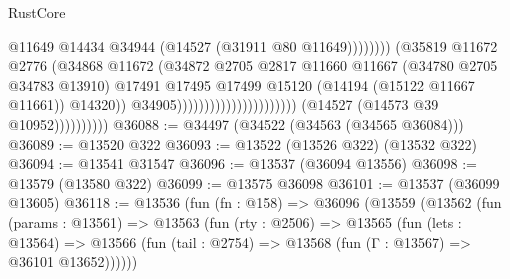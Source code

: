 \begin{lexlean}{RustCore}
\begin{coremodule}
                                                                          @11649
                                                                          @14434
                                                                          @34944
                                                                          (@14527
                                                                            (@31911
                                                                              @80
                                                                              @11649))))))))
                                                              (@35819
                                                                @11672
                                                                @2776
                                                                (@34868
                                                                  @11672
                                                                  (@34872
                                                                    @2705
                                                                    @2817
                                                                    @11660
                                                                    @11667
                                                                    (@34780 @2705 @34783 @13910)
                                                                    @17491
                                                                    @17495
                                                                    @17499
                                                                    @15120
                                                                    (@14194 (@15122 @11667 @11661))
                                                                    @14320))
                                                                @34905))))))))))))))))))))))
                    (@14527 (@14573 @39 @10952))))))))))
@36088 := @34497 (@34522 (@34563 (@34565 @36084)))
@36089 := @13520 @322
@36093 := @13522 (@13526 @322) (@13532 @322)
@36094 := @13541 @31547
@36096 := @13537 (@36094 @13556)
@36098 := @13579 (@13580 @322)
@36099 := @13575 @36098
@36101 := @13537 (@36099 @13605)
@36118 := @13536
    (fun (fn : @158) =>
    @36096
      (@13559
        (@13562
          (fun (params : @13561) =>
          @13563
            (fun (rty : @2506) =>
            @13565
              (fun (lets : @13564) =>
              @13566 (fun (tail : @2754) => @13568 (fun (Γ : @13567) => @36101 @13652))))))

\end{coremodule}
\end{lexlean}
